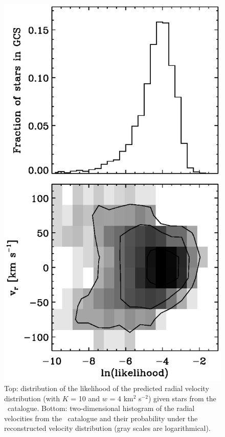 \clearpage
\begin{figure}
\includegraphics{figs_veldist/hist_gcs_like.ps}
\caption[Distribution of the likelihood of the predicted radial velocity distribution given stars from the \gcsabb\ catalogue]{Top: distribution of the likelihood of the predicted radial velocity distribution (with $K$ = 10 and $w$ = 4 km$^2$ s$^{-2}$) given stars from the \gcsabb\ catalogue. Bottom: two-dimensional histogram of the radial velocities from the \gcsabb\ catalogue and their probability under the reconstructed velocity distribution (gray scales are logarithmical).}%
\label{fig:hist_gcs_like}
\end{figure}

